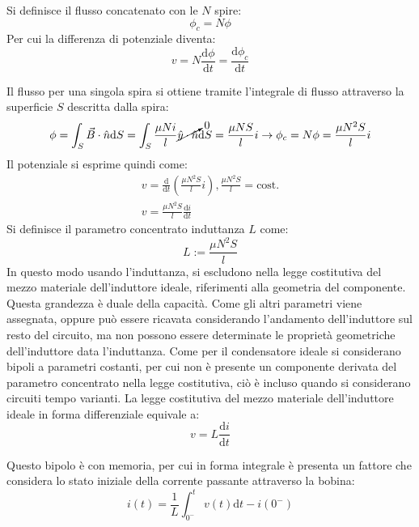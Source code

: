 \documentclass{article}
\newcommand{\df}{\mathrm{d}}
\numberwithin{equation}{subsection}
\begin{document}
Si definisce il flusso concatenato con le $N$ spire:
\begin{equation*}
    \phi_c=N\phi
\end{equation*}
Per cui la differenza di potenziale diventa:
\begin{equation*}
    v=N\displaystyle\frac{\df\phi}{\df t}=\frac{\df\phi_c}{\df t}
\end{equation*}

Il flusso per una singola spira si ottiene tramite l'integrale di flusso attraverso la superficie $S$ descritta dalla spira:
\begin{equation*}
    \phi=\displaystyle\int_S\vec{B}\cdot\hat{n}\df S=\int_S\frac{\mu N i}{l}\cancelto{0}{\hat{y}\cdot\hat{n}}\df S=\frac{\mu N S}{l}i\to \phi_c=N\phi=\frac{\mu N^2S}{l}i
\end{equation*}
Il potenziale si esprime quindi come:
\begin{gather*}
    v=\displaystyle\frac{\df}{\df t}\left(\frac{\mu N^2S}{l}i\right),\frac{\mu N^2S}{l}=\mbox{cost.}\\
    v=\displaystyle\frac{\mu N^2S}{l}\frac{\df i}{\df t}
\end{gather*}
Si definisce il parametro concentrato induttanza $L$ come:
\begin{equation*}
    L:=\displaystyle\frac{\mu N^2S}{l}
\end{equation*} 
In questo modo usando l'induttanza, si escludono nella legge costitutiva del mezzo materiale dell'induttore ideale, riferimenti alla geometria del componente. Questa grandezza 
è duale della capacità. Come gli altri parametri viene assegnata, oppure può essere ricavata considerando l'andamento dell'induttore sul resto del circuito, ma non possono essere 
determinate le proprietà geometriche dell'induttore data l'induttanza. Come per il condensatore ideale si considerano bipoli a parametri costanti, per cui non è presente 
un componente derivata del parametro concentrato nella legge costitutiva, ciò è incluso quando si considerano circuiti tempo varianti.
La legge costitutiva del mezzo materiale dell'induttore ideale in forma differenziale equivale a:
\begin{equation}
    v=\displaystyle L\frac{\df i}{\df t}
\end{equation}

Questo bipolo è con memoria, per cui in forma integrale è presenta un fattore che considera lo stato iniziale della corrente passante attraverso la bobina:
\begin{equation}
    i(t)=\displaystyle\frac{1}{L}\int_{0^-}^tv(t)\df t-i(0^-)
\end{equation}
\end{document}
